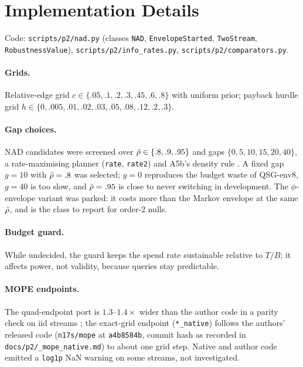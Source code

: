 \section{Implementation Details}\label{app:impl}

Code: \texttt{scripts/p2/nad.py} (classes \texttt{NAD}, \texttt{EnvelopeStarted}, \texttt{TwoStream},
\texttt{RobustnessValue}), \texttt{scripts/p2/info\_rates.py}, \texttt{scripts/p2/comparators.py}.

\paragraph{Grids.} Relative-edge grid $c\in\{.05,.1,.2,.3,.45,.6,.8\}$ with uniform prior; payback
hurdle grid $h\in\{0,.005,.01,.02,.03,.05,.08,.12,.2,.3\}$.

\paragraph{Gap choices.} NAD candidates were screened over $\bar\rho\in\{.8,.9,.95\}$ and gaps
$\{0,5,10,15,20,40\}$, a rate-maximising planner (\texttt{rate}, \texttt{rate2}) and A5b's density
rule \devnote. A fixed gap $g=10$ with $\bar\rho=.8$ was selected; $g=0$ reproduces the budget waste of
QSG-env8, $g=40$ is too slow, and $\bar\rho=.95$ is close to never switching in development. The
$\phi$-envelope variant was parked: it costs more than the Markov envelope at the same $\bar\rho$, and is
the class to report for order-2 nulls.

\paragraph{Budget guard.} While undecided, the guard keeps the spend rate sustainable relative to
$T/B$; it affects power, not validity, because queries stay predictable.

\paragraph{MOPE endpoints.} The quad-endpoint port is $1.3$--$1.4\times$ wider than the author code in
a parity check on iid streams \devnote; the exact-grid endpoint (\texttt{*\_native}) follows the
authors' released code (\texttt{n17s/mope} at \texttt{a4b8584b}, commit hash as recorded in
\texttt{docs/p2/\_mope\_native.md}) to about one grid step. Native and author code emitted a
\texttt{log1p} NaN warning on some streams, not investigated.

